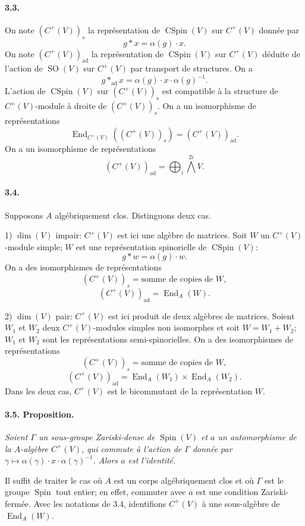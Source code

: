 \documentclass[10pt]{article}
\newcommand{\End}{\operatorname{End}}
\newcommand{\SO}{\operatorname{SO}}
\newcommand{\Spin}{\operatorname{Spin}}
\newcommand{\CSpin}{\operatorname{CSpin}}
\newcommand{\ad}{\operatorname{ad}}
\begin{document}
\paragraph{3.3.} On note $(C^+(V))_s$ la représentation de $\CSpin(V)$ sur $C^+(V)$ donnée par
\[
\tag{3.3.1}
g*x=\alpha(g)\cdot x.
\]
On note $(C^+(V))_{\ad}$ la représentation de $\CSpin(V)$ sur $C^+(V)$ déduite de l'action de $\SO(V)$ sur $C^+(V)$ par transport de structures. On a
\[
\tag{3.3.2}
g*_{\ad}x=\alpha(g)\cdot x\cdot\alpha(g)^{-1}.
\]
L'action de $\CSpin(V)$ sur $(C^+(V))_s$ est compatible à la structure de $C^+(V)$-module à droite de $(C^+(V))_s$. On a un isomorphisme de représentations
\[
\tag{3.3.3}
\End_{C^+(V)}((C^+(V))_s)=(C^+(V))_{\ad}.
\]
On a un isomorphisme de représentations
\[
\tag{3.3.4}
(C^+(V))_{\ad}=\bigoplus_i \bigwedge^{2i} V.
\]

\paragraph{3.4.} Supposons $A$ algébriquement clos. Distinguons deux cas.

1) $\dim(V)$ impair: $C^+(V)$ est ici une algèbre de matrices. Soit $W$ un $C^+(V)$-module simple; $W$ est une représentation spinorielle de $\CSpin(V)$:
\[
g*w=\alpha(g)\cdot w.
\]
On a des isomorphismes de représentations
\[
\tag{3.4.1}
(C^+(V))_s=\text{somme de copies de }W,
\]
\[
\tag{3.4.2}
(C^+(V))_{\ad}=\End_A(W).
\]

2) $\dim(V)$ pair: $C^+(V)$ est ici produit de deux algèbres de matrices. Soient $W_1$ et $W_2$ deux $C^+(V)$-modules simples non isomorphes et soit $W=W_1+W_2$; $W_1$ et $W_2$ sont les représentations semi-spinorielles. On a des isomorphismes de représentations
\[
\tag{3.4.3}
(C^+(V))_s=\text{somme de copies de }W,
\]
\[
\tag{3.4.4}
(C^+(V))_{\ad}=\End_A(W_1)\times\End_A(W_2).
\]
Dans les deux cas, $C^+(V)$ est le bicommutant de la représentation $W$.

\paragraph{3.5. Proposition.} \emph{Soient $\Gamma$ un sous-groupe Zariski-dense de $\Spin(V)$ et $a$ un automorphisme de la $A$-algèbre $C^+(V)$, qui commute à l'action de $\Gamma$ donnée par $\gamma\mapsto\alpha(\gamma)\cdot x\cdot\alpha(\gamma)^{-1}$. Alors $a$ est l'identité.}

Il suffit de traiter le cas où $A$ est un corps algébriquement clos et où $\Gamma$ est le groupe $\Spin$ tout entier; en effet, commuter avec $a$ est une condition Zariski-fermée. Avec les notations de 3.4, identifions $C^+(V)$ à une sous-algèbre de $\End_A(W)$.
\end{document}
